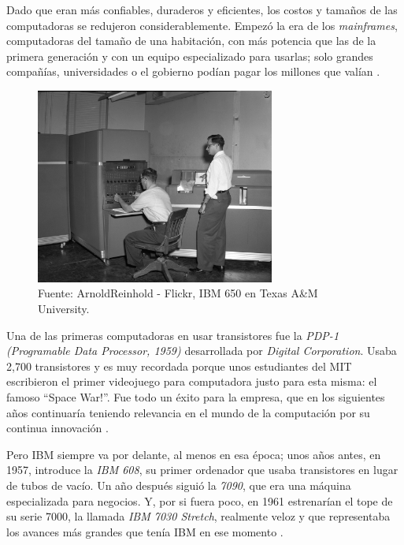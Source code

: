 \documentclass[letterpaper,12pt,oneside]{book}
\begin{document}
        Dado que eran más confiables, duraderos y eficientes, los costos
		y tamaños de las computadoras se redujeron considerablemente. Empezó la era de los \textit{mainframes}, computadoras del tamaño
		de una habitación, con más potencia que las de la primera generación y con un equipo especializado para usarlas; solo grandes compañías, universidades o
		el gobierno podían pagar los millones que valían \cite{oregan_brief_2012,tanenbaum_modern_2002}.
		
		\begin{figure}
		    \centering
		    \includegraphics[width=0.7\textwidth]{media/Historia/Wikipedia_IBM_650_at_Texas_A&M.jpeg}
		    \caption{Fuente: ArnoldReinhold - Flickr, IBM 650 en Texas A\&M University.} %
	    	\label{fig:ibm650}
		\end{figure}

		
		Una de las primeras computadoras en usar transistores fue la \textit{PDP-1 (Programable Data Processor, 1959)} desarrollada por \textit{Digital Corporation}. Usaba
		2,700 transistores y es muy recordada porque unos estudiantes del MIT escribieron el primer videojuego para computadora justo para esta misma: el famoso
		``Space War!''. Fue todo un éxito para la empresa, que en los siguientes años continuaría teniendo relevancia en el mundo de la computación
		por su continua innovación \cite{oregan_brief_2012}.
  
        Pero IBM siempre va por delante, al menos en esa época; unos años antes, en 1957, introduce la \textit{IBM 608}, su primer ordenador
		que usaba transistores en lugar de tubos de vacío. Un año después siguió la \textit{7090}, que era una máquina especializada para negocios. Y, por si fuera poco,
		en 1961 estrenarían el tope de su serie 7000, la llamada \textit{IBM 7030 Stretch}, realmente veloz y que representaba los avances más grandes
		que tenía IBM en ese momento \cite{oregan_brief_2012,computer_history_museum_computers_nodate}.
		
\end{document}
